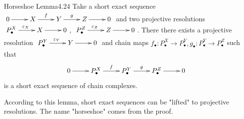 \documentclass[twoside = false,	%
		headsepline,		%
		parskip = true,
		]{scrbook}						%
\begin{document}
    \begin{lemma}{Horseshoe Lemma}{4.24}
        Take a short exact sequence $\xymatrix{0 \ar[r]& X\ar[r]^{f} & Y\ar[r]^g & Z\ar[r] & 0}$ and two projective resolutions $\xymatrix {P_\bullet^X \ar[r]^{\e_X} & X \ar[r] & 0}$, $\xymatrix {P_\bullet^Z \ar[r]^{\e_Z} & Z \ar[r] & 0}$. There there exists a projective resolution $\xymatrix {P_\bullet^Y \ar[r]^{\e_Y} & Y \ar[r] & 0}$ and chain maps $f_\bullet:P_\bullet^X \to P_\bullet^Y, g_\bullet: P_\bullet^Y \to P_\bullet^Z$ such that
        \begin{equation*}
        \xymatrix {
            0 \ar[r]& P_\bullet^X \ar[r]^f & \ar[r]^g P_\bullet^Y & P_\bullet^Z \ar[r] & 0 
        }
        \end{equation*} is a short exact sequence of chain complexes.
    \end{lemma}
    According to this lemma, short exact sequences can be "lifted" to projective resolutions. The name "horseshoe" comes from the proof.
    
\end{document}
